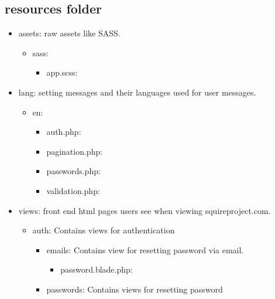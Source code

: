 
\subsection{resources folder}
\begin{itemize}
    \item assets: raw assets like SASS.
    \begin{itemize}
        \item sass:
        \begin{itemize}
            \item app.scss:
        \end{itemize}
    \end{itemize}
    \item lang: setting messages and their languages used for user messages.
    \begin{itemize}
        \item en:
        \begin{itemize}
            \item auth.php:
            \item pagination.php:
            \item passwords.php: 
            \item validation.php: 
        \end{itemize}
    \end{itemize}
    \item views: front end html pages users see when viewing squireproject.com.
    \begin{itemize}
        \item auth: Contains views for authentication
        \begin{itemize}
            \item emails: Contains view for resetting password via email.
            \begin{itemize}
                \item password.blade.php:
            \end{itemize}
            \item passwords: Contains views for resetting password
            \begin{itemize}

\end{itemize}
\end{itemize}
\end{itemize}
\end{itemize}
